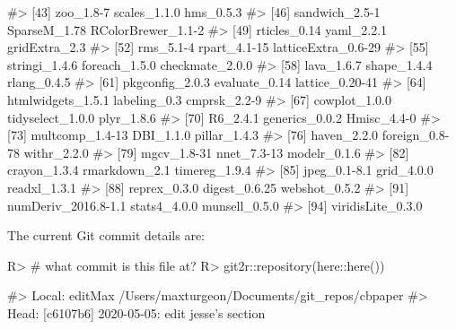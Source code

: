 \documentclass[
]{jss}
\begin{document}
\begin{CodeChunk}
\begin{CodeOutput}
#> [43] zoo_1.8-7           scales_1.1.0        hms_0.5.3          
#> [46] sandwich_2.5-1      SparseM_1.78        RColorBrewer_1.1-2 
#> [49] rticles_0.14        yaml_2.2.1          gridExtra_2.3      
#> [52] rms_5.1-4           rpart_4.1-15        latticeExtra_0.6-29
#> [55] stringi_1.4.6       foreach_1.5.0       checkmate_2.0.0    
#> [58] lava_1.6.7          shape_1.4.4         rlang_0.4.5        
#> [61] pkgconfig_2.0.3     evaluate_0.14       lattice_0.20-41    
#> [64] htmlwidgets_1.5.1   labeling_0.3        cmprsk_2.2-9       
#> [67] cowplot_1.0.0       tidyselect_1.0.0    plyr_1.8.6         
#> [70] R6_2.4.1            generics_0.0.2      Hmisc_4.4-0        
#> [73] multcomp_1.4-13     DBI_1.1.0           pillar_1.4.3       
#> [76] haven_2.2.0         foreign_0.8-78      withr_2.2.0        
#> [79] mgcv_1.8-31         nnet_7.3-13         modelr_0.1.6       
#> [82] crayon_1.3.4        rmarkdown_2.1       timereg_1.9.4      
#> [85] jpeg_0.1-8.1        grid_4.0.0          readxl_1.3.1       
#> [88] reprex_0.3.0        digest_0.6.25       webshot_0.5.2      
#> [91] numDeriv_2016.8-1.1 stats4_4.0.0        munsell_0.5.0      
#> [94] viridisLite_0.3.0
\end{CodeOutput}
\end{CodeChunk}

The current Git commit details are:

\begin{CodeChunk}

\begin{CodeInput}
R> # what commit is this file at?
R> git2r::repository(here::here())
\end{CodeInput}

\begin{CodeOutput}
#> Local:    editMax /Users/maxturgeon/Documents/git_repos/cbpaper
#> Head:     [c6107b6] 2020-05-05: edit jesse's section
\end{CodeOutput}
\end{CodeChunk}


\end{document}
